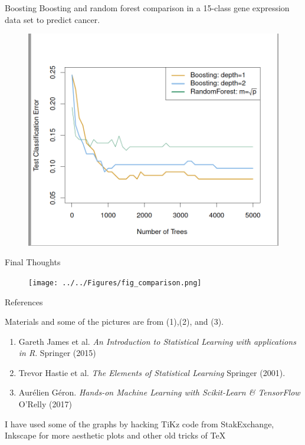 \documentclass{beamer}
\begin{document}
	
	\begin{frame}{Boosting}
		Boosting and random forest comparison in a 15-class gene expression data set to predict cancer.
		\begin{figure}[h]
			\centering
			\includegraphics[scale=0.35]{../../Figures/fig_boosting.png}
		\end{figure}
		
	\end{frame}
	
	\begin{frame}{Final Thoughts}
		
		\begin{figure}[h]
			\centering
			\texttt{[image: ../../Figures/fig\_comparison.png]}
		\end{figure}
	\end{frame}
	
	\begin{frame}{References}
		
		Materials and some of the pictures are from (1),(2), and (3).
		\begin{enumerate}
			\item Gareth James et al. {\it An Introduction to Statistical Learning with applications in R}. Springer (2015)
			\item Trevor Hastie et al. {\it The Elements of Statistical Learning } Springer (2001). 
			\item Aur\'elien G\'eron. {\it Hands-on Machine Learning with Scikit-Learn \& TensorFlow} O'Relly (2017)
			
		\end{enumerate}	
		
		I have used some of the graphs by hacking TiKz code from StakExchange, Inkscape for more aesthetic plots and other old tricks of \TeX
	\end{frame}	
	
	
\end{document}
